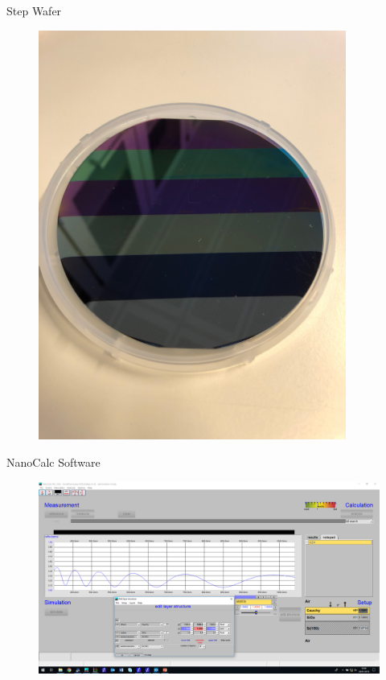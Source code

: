\documentclass[10pt]{beamer}
\begin{document}
\begin{frame}{Step Wafer}
	\begin{figure}
	\centering
	\includegraphics[width=0.9\textwidth,angle=-90]{stepwafer.JPG}
	\end{figure}
\end{frame}
	
	
\begin{frame}{NanoCalc Software}
	\begin{figure}
		\includegraphics[width=\textwidth]{nanocalc.png}
	\end{figure}
\end{frame}
\end{document}

